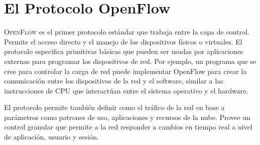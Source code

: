 \documentclass[10pt,journal,compsoc]{IEEEtran}
\begin{document}

 








\section{El Protocolo OpenFlow}
\textsc{OpenFlow} es el primer protocolo estándar que trabaja entre la capa de control. Permite el acceso directo y el manejo de los dispositivos físicos o virtuales. El protocolo especifica primitivas básicas que pueden ser usadas por aplicaciones externas para programar los dispositivos de  red. Por ejemplo, un programa que se cree para controlar la carga de red puede implementar OpenFlow para crear la comunicación entre los dispositivos de la red y el software, similar a las instrucciones de CPU que interactúan entre el sistema operativo y el hardware. 

El protocolo permite también definir como el tráfico de la red en base a parámetros como patrones de uso, aplicaciones y recursos de la nube. Provee un control granular que permite a la red responder a cambios en tiempo real a nivel de aplicación, usuario y sesión. 
\end{document}
